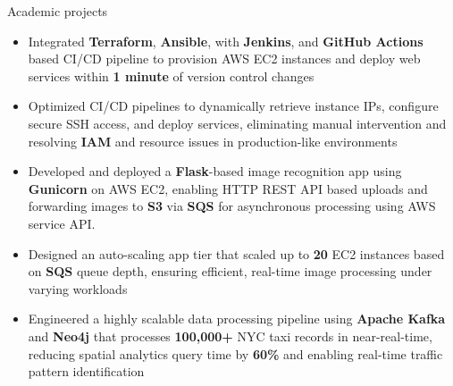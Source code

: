 \documentclass{resume}
\begin{document}
\begin{experienceSection}{Academic projects}

    \projectItem[
        title={End-to-end Deployment Automation},
        duration={Apr 2025},
    ]
    \begin{itemize}
        \vspace{-0.5em}
        \itemsep -6pt {}

        \item Integrated \textbf{Terraform}, \textbf{Ansible}, with \textbf{Jenkins}, and \textbf{GitHub Actions} based CI/CD pipeline to provision AWS EC2 instances and deploy web services within \textbf{1 minute} of version control changes
        \item Optimized CI/CD pipelines to dynamically retrieve instance IPs, configure secure SSH access, and deploy services,
        eliminating manual intervention and resolving \textbf{IAM} and resource issues in production-like environments
    \end{itemize}

    \projectItem[
        title=AWS-based Face Recognition App,
        duration={May 2024},
    ]
    \begin{itemize}
        \vspace{-0.5em}
        \itemsep -6pt {}
        \item Developed and deployed a \textbf{Flask}-based image recognition app using \textbf{Gunicorn} on AWS EC2, enabling HTTP REST API based uploads and forwarding images to \textbf{S3} via \textbf{SQS} for asynchronous processing using AWS service API.
        \item Designed an auto-scaling app tier that scaled up to \textbf{20} EC2 instances based on \textbf{SQS} queue depth, ensuring efficient, real-time image processing under varying workloads
    \end{itemize}

    \projectItem[
        title=Kubernetes-based Data Processing Pipeline,
        duration={Nov 2024},
    ]
    \begin{itemize}
        \vspace{-0.5em}
        \itemsep -6pt {}
        \item Engineered a highly scalable data processing pipeline using \textbf{Apache Kafka} and \textbf{Neo4j} that processes \textbf{100,000+} NYC taxi records in near-real-time, reducing spatial analytics query time by \textbf{60\%} and enabling real-time traffic pattern identification
    \end{itemize}
    
\end{experienceSection}
\end{document}
